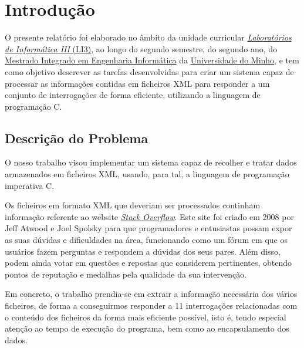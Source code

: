 \documentclass[a4paper]{report}
\begin{document}
\tableofcontents

\chapter{Introdução}
\label{ch:intro}

O presente relatório foi elaborado no âmbito da unidade curricular
\href{http://miei.di.uminho.pt/plano_estudos.html#laborat_rios_de_inform_tica_iii}
{\emph {Laboratórios de Informática III} (LI3)}, ao longo do segundo semestre,
do segundo ano, do \href{http://miei.di.uminho.pt}{Mestrado Integrado em Engenharia Informática}
da \href{https://www.uminho.pt}{Universidade do Minho}, e tem como objetivo
descrever as tarefas desenvolvidas para criar um sistema capaz de processar as
informações contidas em ficheiros XML para responder a um conjunto de
interrogações de forma eficiente, utilizando a linguagem de programação C.


\section{Descrição do Problema}
\label{sec:problema}

O nosso trabalho visou implementar um sistema capaz de recolher e tratar dados
armazenados em ficheiros XML, usando, para tal, a linguagem de programação
imperativa C.

Os ficheiros em formato XML que deveriam ser processados continham informação referente ao
website \href{https://stackoverflow.com/}{\textit{Stack Overflow}}.
Este site foi criado em 2008 por Jeff Atwood e Joel Spolsky para que programadores e
entusiastas possam expor as suas dúvidas e
dificuldades na área, funcionando como um fórum em que os usuários fazem
perguntas e respondem a dúvidas dos seus pares. Além disso, podem ainda votar
em questões e repostas que considerem pertinentes, obtendo pontos de reputação
e medalhas pela qualidade da sua intervenção.

Em concreto, o trabalho prendia-se em extrair a informação necessária dos vários
ficheiros, de forma a conseguirmos responder a 11 interrogações relacionadas com
o conteúdo dos ficheiros da forma mais eficiente possível, isto é, tendo especial
atenção ao tempo de execução do programa, bem como ao encapsulamento dos dados.
\end{document}
